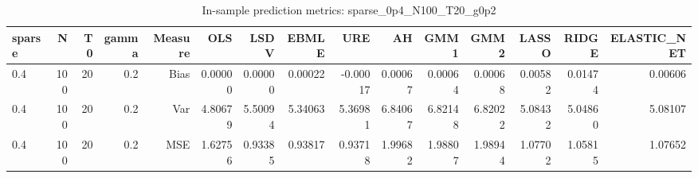\begin{table}[!htbp]\centering
\caption{In-sample prediction metrics: sparse_0p4_N100_T20_g0p2}
\label{tab:table2_sparse_0p4_N100_T20_g0p2}
\begin{tabular}{lrrrrrrrrrrrrrr}
\hline
sparse & N & T0 & gamma & Measure & OLS & LSDV & EBMLE & URE & AH & GMM1 & GMM2 & LASSO & RIDGE & ELASTIC_NET \\
\hline
0.4 & 100 & 20 & 0.2 & Bias & 0.00000 & 0.00000 & 0.00022 & -0.00017 & 0.00067 & 0.00064 & 0.00068 & 0.00582 & 0.01474 & 0.00606 \\
0.4 & 100 & 20 & 0.2 & Var & 4.80679 & 5.50094 & 5.34063 & 5.36981 & 6.84067 & 6.82148 & 6.82022 & 5.08432 & 5.04860 & 5.08107 \\
0.4 & 100 & 20 & 0.2 & MSE & 1.62756 & 0.93385 & 0.93817 & 0.93718 & 1.99682 & 1.98807 & 1.98944 & 1.07702 & 1.05815 & 1.07652 \\
\hline
\end{tabular}
\end{table}

